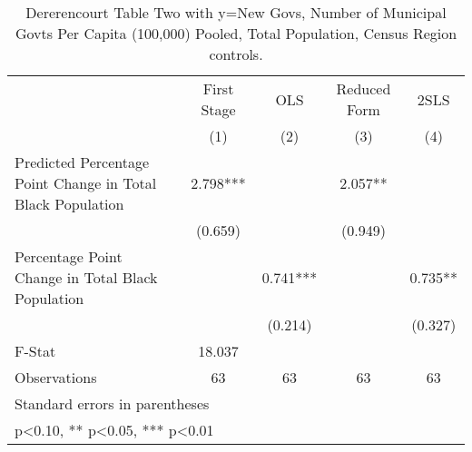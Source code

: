 \begin{table}[htbp]\centering
\def\sym#1{\ifmmode^{#1}\else\(^{#1}\)\fi}
\caption{Dererencourt Table Two with y=New Govs, Number of Municipal Govts Per Capita (100,000) Pooled, Total Population, Census Region controls.}
\begin{tabular}{l*{4}{c}}
\toprule
                    & First Stage   &         OLS   &Reduced Form   &        2SLS   \\
                    &\multicolumn{1}{c}{(1)}   &\multicolumn{1}{c}{(2)}   &\multicolumn{1}{c}{(3)}   &\multicolumn{1}{c}{(4)}   \\
\midrule
Predicted Percentage Point Change in Total Black Population&       2.798***&               &       2.057** &               \\
                    &     (0.659)   &               &     (0.949)   &               \\
\addlinespace
Percentage Point Change in Total Black Population&               &       0.741***&               &       0.735** \\
                    &               &     (0.214)   &               &     (0.327)   \\
\midrule
F-Stat              &      18.037   &               &               &               \\
Observations        &          63   &          63   &          63   &          63   \\
\bottomrule
\multicolumn{5}{l}{\footnotesize Standard errors in parentheses}\\
\multicolumn{5}{l}{\footnotesize * p<0.10, ** p<0.05, *** p<0.01}\\
\end{tabular}
\end{table}
